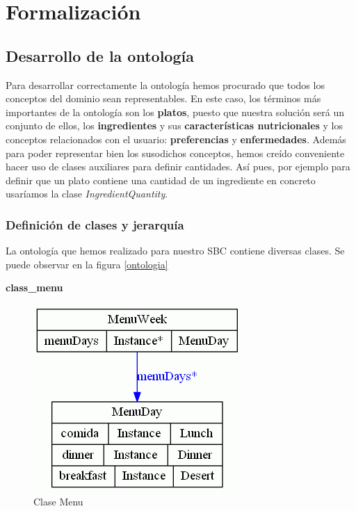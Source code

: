 \documentclass[12]{article}
\begin{document}
\section{Formalización}

\subsection{Desarrollo de la ontología}
Para desarrollar correctamente la ontología hemos procurado que todos los conceptos del dominio sean representables. En este caso, los términos más importantes de la ontología son los \textbf{platos}, puesto que nuestra solución será un conjunto de ellos, los \textbf{ingredientes} y sus \textbf{características nutricionales} y los conceptos relacionados con el usuario: \textbf{preferencias} y \textbf{enfermedades}. Además para poder representar bien los susodichos conceptos, hemos creído conveniente hacer uso de clases auxiliares para definir cantidades. Así pues, por ejemplo para definir que un plato contiene una cantidad de un ingrediente en concreto usaríamos la clase \textit{IngredientQuantity}.

\subsubsection{Definición de clases y jerarquía}

La ontología que hemos realizado para nuestro SBC contiene diversas clases. Se puede observar en la figura \ref{ontologia}



\textbf{class\_menu}
\begin{figure}[H]
\centering
\includegraphics[scale=0.5]{images/classMenu.png}
\caption{Clase Menu}
\label{menu}
\end{figure}
\end{document}
